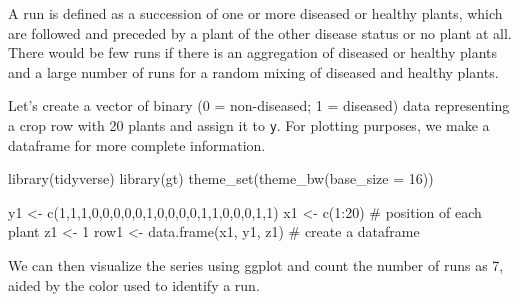 \documentclass[
  letterpaper,
  DIV=11,
  numbers=noendperiod]{scrreprt}
\newenvironment{Shaded}{\begin{snugshade}}{\end{snugshade}}
\newcommand{\AttributeTok}[1]{\textcolor[rgb]{0.40,0.45,0.13}{#1}}
\newcommand{\CommentTok}[1]{\textcolor[rgb]{0.37,0.37,0.37}{#1}}
\newcommand{\DecValTok}[1]{\textcolor[rgb]{0.68,0.00,0.00}{#1}}
\newcommand{\FunctionTok}[1]{\textcolor[rgb]{0.28,0.35,0.67}{#1}}
\newcommand{\NormalTok}[1]{\textcolor[rgb]{0.00,0.23,0.31}{#1}}
\newcommand{\OtherTok}[1]{\textcolor[rgb]{0.00,0.23,0.31}{#1}}
\newcommand{\SpecialCharTok}[1]{\textcolor[rgb]{0.37,0.37,0.37}{#1}}
\begin{document}
A run is defined as a succession of one or more diseased or healthy
plants, which are followed and preceded by a plant of the other disease
status or no plant at all. There would be few runs if there is an
aggregation of diseased or healthy plants and a large number of runs for
a random mixing of diseased and healthy plants.

Let's create a vector of binary (0 = non-diseased; 1 = diseased) data
representing a crop row with 20 plants and assign it to \texttt{y}. For
plotting purposes, we make a dataframe for more complete information.

\begin{Shaded}
\begin{Highlighting}[]
\FunctionTok{library}\NormalTok{(tidyverse) }
\FunctionTok{library}\NormalTok{(gt)}
\FunctionTok{theme\_set}\NormalTok{(}\FunctionTok{theme\_bw}\NormalTok{(}\AttributeTok{base\_size =} \DecValTok{16}\NormalTok{))}
\end{Highlighting}
\end{Shaded}

\begin{Shaded}
\begin{Highlighting}[]
\NormalTok{y1 }\OtherTok{\textless{}{-}} \FunctionTok{c}\NormalTok{(}\DecValTok{1}\NormalTok{,}\DecValTok{1}\NormalTok{,}\DecValTok{1}\NormalTok{,}\DecValTok{0}\NormalTok{,}\DecValTok{0}\NormalTok{,}\DecValTok{0}\NormalTok{,}\DecValTok{0}\NormalTok{,}\DecValTok{0}\NormalTok{,}\DecValTok{1}\NormalTok{,}\DecValTok{0}\NormalTok{,}\DecValTok{0}\NormalTok{,}\DecValTok{0}\NormalTok{,}\DecValTok{0}\NormalTok{,}\DecValTok{1}\NormalTok{,}\DecValTok{1}\NormalTok{,}\DecValTok{0}\NormalTok{,}\DecValTok{0}\NormalTok{,}\DecValTok{0}\NormalTok{,}\DecValTok{1}\NormalTok{,}\DecValTok{1}\NormalTok{)}
\NormalTok{x1 }\OtherTok{\textless{}{-}} \FunctionTok{c}\NormalTok{(}\DecValTok{1}\SpecialCharTok{:}\DecValTok{20}\NormalTok{) }\CommentTok{\# position of each plant}
\NormalTok{z1 }\OtherTok{\textless{}{-}} \DecValTok{1}
\NormalTok{row1 }\OtherTok{\textless{}{-}} \FunctionTok{data.frame}\NormalTok{(x1, y1, z1) }\CommentTok{\# create a dataframe}
\end{Highlighting}
\end{Shaded}

We can then visualize the series using ggplot and count the number of
runs as 7, aided by the color used to identify a run.
\end{document}

